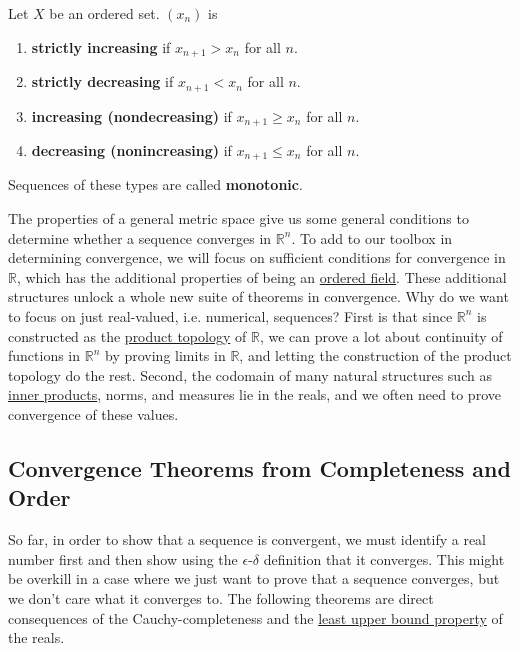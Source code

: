   \begin{definition}
    \label{def:monotonic-sequences}
    Let $X$ be an ordered set. $(x_n)$ is 
    \begin{enumerate}
      \item \textbf{strictly increasing} if $x_{n+1} > x_n$ for all $n$.
      \item \textbf{strictly decreasing} if $x_{n+1} < x_n$ for all $n$.
      \item \textbf{increasing (nondecreasing)} if $x_{n+1} \geq x_n$ for all $n$.
      \item \textbf{decreasing (nonincreasing)} if $x_{n+1} \leq x_n$ for all $n$.
    \end{enumerate}
    Sequences of these types are called \textbf{monotonic}. 
  \end{definition}

  The properties of a general metric space give us some general conditions to determine whether a sequence converges in $\mathbb{R}^n$. To add to our toolbox in determining convergence, we will focus on sufficient conditions for convergence in $\mathbb{R}$, which has the additional properties of being an \hyperref[alg-def:ordered-field]{ordered field}. These additional structures unlock a whole new suite of theorems in convergence. Why do we want to focus on just real-valued, i.e. numerical, sequences? First is that since $\mathbb{R}^n$ is constructed as the \hyperref[pst-def:product-topology]{product topology} of $\mathbb{R}$, we can prove a lot about continuity of functions in $\mathbb{R}^n$ by proving limits in $\mathbb{R}$, and letting the construction of the product topology do the rest. Second, the codomain of many natural structures such as \hyperref[lin-def:inner-product]{inner products}, norms, and measures lie in the reals, and we often need to prove convergence of these values.  

\subsection{Convergence Theorems from Completeness and Order}

  So far, in order to show that a sequence is convergent, we must identify a real number first and then show using the $\epsilon$-$\delta$ definition that it converges. This might be overkill in a case where we just want to prove that a sequence converges, but we don't care what it converges to. The following theorems are direct consequences of the Cauchy-completeness and the \hyperref[def:least-upper-bound-property]{least upper bound property} of the reals. 

